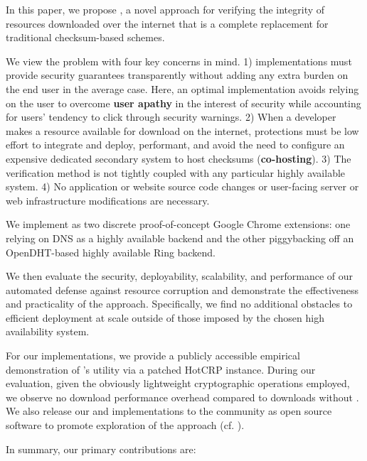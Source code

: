 In this paper, we propose \SYSTEM{}, a novel approach for verifying the
integrity of resources downloaded over the internet that is a complete
replacement for traditional checksum-based schemes.

We view the problem with four key concerns in mind. 1) \SYSTEM{} implementations
must provide security guarantees transparently without adding any extra burden
on the end user in the average case. Here, an optimal implementation avoids
relying on the user to overcome \textbf{user apathy} in the interest of security
while accounting for users' tendency to click through security warnings. 2) When
a developer makes a resource available for download on the internet, \SYSTEM{}
protections must be low effort to integrate and deploy, performant, and avoid
the need to configure an expensive dedicated secondary system to host checksums
(\ie \textbf{co-hosting}). 3) The verification method is not tightly coupled
with any particular highly available system. 4) No application or website source
code changes or user-facing server or web infrastructure modifications are
necessary.

We implement \SYSTEM{} as two discrete proof-of-concept Google Chrome
extensions: one relying on DNS as a highly available backend and the other
piggybacking off an OpenDHT-based highly available Ring backend.

We then evaluate the security, deployability, scalability, and performance of
our automated defense against resource corruption and demonstrate the
effectiveness and practicality of the \SYSTEM{} approach. Specifically, we find
no additional obstacles to efficient deployment at scale outside of those
imposed by the chosen high availability system.

For our implementations, we provide a publicly accessible empirical
demonstration of \SYSTEM{}'s utility via a patched HotCRP instance. During our
evaluation, given the obviously lightweight cryptographic operations employed,
we observe no download performance overhead compared to downloads without
\SYSTEM{}. We also release our \DNSSYS{} and \DHTSYS{} implementations to the
community as open source software to promote exploration of the \SYSTEM{}
approach (cf. ).

In summary, our primary contributions are:

